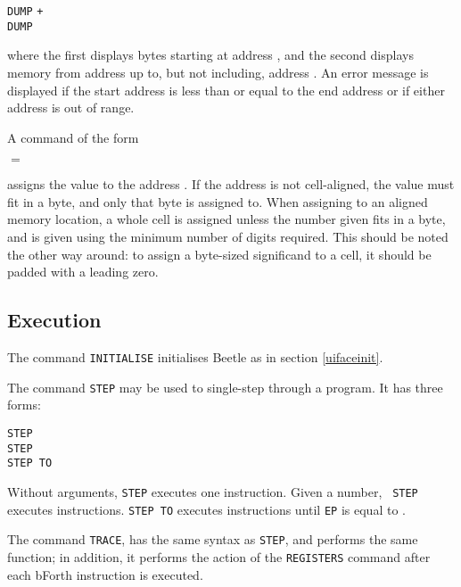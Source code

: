 \begin{center}
{\tt DUMP}  \tt{+} \\
{\tt DUMP}  
\end{center}

where the first displays  bytes starting at address
, and the second displays memory from address 
up to, but not including, address . An error message is
displayed if the start address is less than or equal to the end address or if
either address is out of range.

A command of the form

\begin{center} $=$ \end{center}

assigns the value  to the address . If the address
is not cell-aligned, the value must fit in a byte, and only that byte is
assigned to. When assigning to an aligned memory location, a whole cell is
assigned unless the number given fits in a byte, and is given using the
minimum number of digits required. This should be noted the other way around:
to assign a byte-sized significand to a cell, it should be padded with a
leading zero.

\subsection{Execution}

The command {\tt INITIALISE} initialises Beetle as in section
\ref{uifaceinit}.

The command {\tt STEP} may be used to single-step through a program. It has
three forms:

\begin{center}
{\tt STEP}\\
{\tt STEP} \\
{\tt STEP TO} 
\end{center}

Without arguments, {\tt STEP} executes one instruction. Given a number, {\tt
STEP} executes  instructions. {\tt STEP TO} executes
instructions until {\tt EP} is equal to .

The command {\tt TRACE}, has the same syntax as {\tt STEP}, and performs the
same function; in addition, it performs the action of the {\tt REGISTERS}
command after each bForth instruction is executed.

